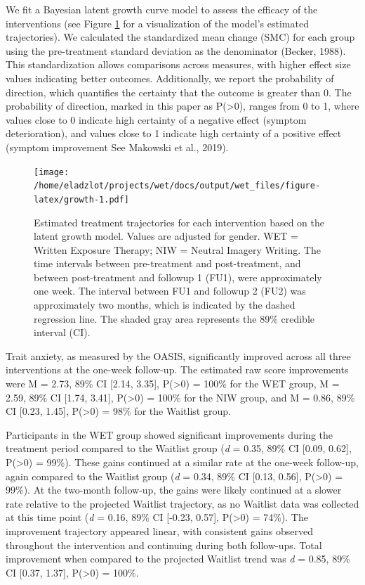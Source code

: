 \documentclass[
  man,floatsintext]{apa7}
\begin{document}
We fit a Bayesian latent growth curve model to assess the efficacy of the interventions (see Figure \ref{fig:growth} for a visualization of the model's estimated trajectories).
We calculated the standardized mean change (SMC) for each group using the pre-treatment standard deviation as the denominator (Becker, 1988).
This standardization allows comparisons across measures, with higher effect size values indicating better outcomes.
Additionally, we report the probability of direction, which quantifies the certainty that the outcome is greater than 0.
The probability of direction, marked in this paper as P(\textgreater0), ranges from 0 to 1, where values close to 0 indicate high certainty of a negative effect (symptom deterioration), and values close to 1 indicate high certainty of a positive effect (symptom improvement See Makowski et al., 2019).



\begin{figure}
\centering
\texttt{[image: /home/eladzlot/projects/wet/docs/output/wet\_files/figure-latex/growth-1.pdf]}
\caption{\label{fig:growth}Estimated treatment trajectories for each intervention based on the latent growth model. Values are adjusted for gender. WET = Written Exposure Therapy; NIW = Neutral Imagery Writing. The time intervals between pre-treatment and post-treatment, and between post-treatment and followup 1 (FU1), were approximately one week. The interval between FU1 and followup 2 (FU2) was approximately two months, which is indicated by the dashed regression line. The shaded gray area represents the 89\% credible interval (CI).}
\end{figure}

Trait anxiety, as measured by the OASIS, significantly improved across all three interventions at the one-week follow-up.
The estimated raw score improvements were M = 2.73, 89\% CI {[}2.14, 3.35{]}, P(\textgreater0) = 100\% for the WET group, M = 2.59, 89\% CI {[}1.74, 3.41{]}, P(\textgreater0) = 100\% for the NIW group, and M = 0.86, 89\% CI {[}0.23, 1.45{]}, P(\textgreater0) = 98\% for the Waitlist group.

Participants in the WET group showed significant improvements during the treatment period compared to the Waitlist group (\emph{d} = 0.35, 89\% CI {[}0.09, 0.62{]}, P(\textgreater0) = 99\%).
These gains continued at a similar rate at the one-week follow-up, again compared to the Waitlist group (\emph{d} = 0.34, 89\% CI {[}0.13, 0.56{]}, P(\textgreater0) = 99\%).
At the two-month follow-up, the gains were likely continued at a slower rate relative to the projected Waitlist trajectory, as no Waitlist data was collected at this time point (\emph{d} = 0.16, 89\% CI {[}-0.23, 0.57{]}, P(\textgreater0) = 74\%).
The improvement trajectory appeared linear, with consistent gains observed throughout the intervention and continuing during both follow-ups.
Total improvement when compared to the projected Waitlist trend was \emph{d} = 0.85, 89\% CI {[}0.37, 1.37{]}, P(\textgreater0) = 100\%.
\end{document}
